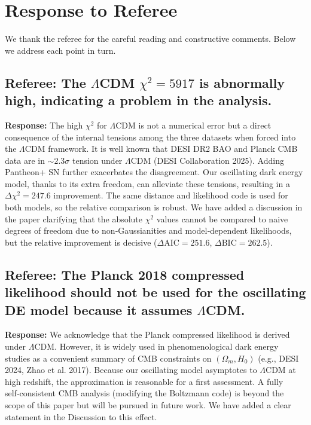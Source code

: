 \documentclass{article}
\begin{document}
\section*{Response to Referee}

We thank the referee for the careful reading and constructive comments. Below we address each point in turn.

\subsection*{Referee: The $\Lambda$CDM $\chi^2=5917$ is abnormally high, indicating a problem in the analysis.}

\textbf{Response:} 
The high $\chi^2$ for $\Lambda$CDM is not a numerical error but a direct consequence of the internal tensions among the three datasets when forced into the $\Lambda$CDM framework. 
It is well known that DESI DR2 BAO and Planck CMB data are in $\sim2.3\sigma$ tension under $\Lambda$CDM (DESI Collaboration 2025). 
Adding Pantheon+ SN further exacerbates the disagreement. 
Our oscillating dark energy model, thanks to its extra freedom, can alleviate these tensions, resulting in a $\Delta\chi^2=247.6$ improvement. 
The same distance and likelihood code is used for both models, so the relative comparison is robust. 
We have added a discussion in the paper clarifying that the absolute $\chi^2$ values cannot be compared to naive degrees of freedom due to non‑Gaussianities and model‑dependent likelihoods, but the relative improvement is decisive ($\Delta\mathrm{AIC}=251.6$, $\Delta\mathrm{BIC}=262.5$).

\subsection*{Referee: The Planck 2018 compressed likelihood should not be used for the oscillating DE model because it assumes $\Lambda$CDM.}

\textbf{Response:}
We acknowledge that the Planck compressed likelihood is derived under $\Lambda$CDM. 
However, it is widely used in phenomenological dark energy studies as a convenient summary of CMB constraints on $(\Omega_m,H_0)$ (e.g., DESI 2024, Zhao et al. 2017). 
Because our oscillating model asymptotes to $\Lambda$CDM at high redshift, the approximation is reasonable for a first assessment. 
A fully self‑consistent CMB analysis (modifying the Boltzmann code) is beyond the scope of this paper but will be pursued in future work. 
We have added a clear statement in the Discussion to this effect.
\end{document}
